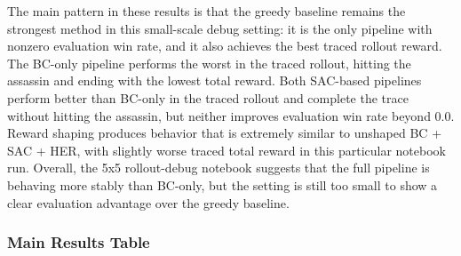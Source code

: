 \documentclass[9pt]{article}
\begin{document}
The main pattern in these results is that the greedy baseline remains
the strongest method in this small-scale debug setting: it is the only
pipeline with nonzero evaluation win rate, and it also achieves the
best traced rollout reward. The BC-only pipeline performs the worst in
the traced rollout, hitting the assassin and ending with the lowest
total reward. Both SAC-based pipelines perform better than BC-only in
the traced rollout and complete the trace without hitting the assassin,
but neither improves evaluation win rate beyond 0.0. Reward shaping
produces behavior that is extremely similar to unshaped BC + SAC + HER,
with slightly worse traced total reward in this particular notebook run.
Overall, the 5x5 rollout-debug notebook suggests that the full pipeline
is behaving more stably than BC-only, but the setting is still too
small to show a clear evaluation advantage over the greedy baseline.

\subsubsection{Main Results Table}\label{main-results-table-template}
\end{document}
